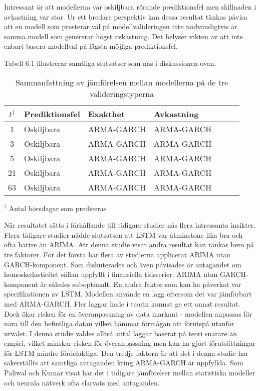 \documentclass[11pt]{article}
\numberwithin{equation}{section}
\numberwithin{table}{section}
\numberwithin{figure}{section}
\begin{document}
Intressant är att modellerna var oskiljbara rörande prediktionsfel men skillnaden i avkastning var stor. Ur ett bredare perspektiv kan dessa resultat tänkas påvisa att en modell som presterar väl på modellvalideringen inte nödvändigtvis är samma modell som genererar högst avkastning. Det belyser vikten av att inte enbart basera modellval på lägsta möjliga prediktionsfel. 

Tabell 6.1 illustrerar samtliga slutsatser som nås i diskussionen ovan.

\begin{table}[H]
\caption{Sammanfattning av jämförelsen mellan modellerna på de tre valideringstyperna}

\begin{tabularx}{\textwidth}{c *{6}{Y}}
\toprule
$t ^\dagger$  & Prediktionsfel & Exakthet & Avkastning \\
\hline

1      & Oskiljbara          & ARMA-GARCH                 & ARMA-GARCH          \\
3      & Oskiljbara          & ARMA-GARCH          & ARMA-GARCH    \\

5      & Oskiljbara          & ARMA-GARCH         &ARMA-GARCH   \\

21     &  Oskiljbara         & ARMA-GARCH         & ARMA-GARCH   \\


63     & Oskiljbara         & ARMA-GARCH         & ARMA-GARCH    \\ 

\bottomrule
\end{tabularx}
\footnotesize{$^\dagger$ Antal börsdagar som prediceras}
\end{table}

När resultatet sätts i förhållande till tidigare studier nås flera intressanta insikter. Flera tidigare studier nådde slutsatsen att LSTM var åtminstone lika bra och ofta bättre än ARIMA. Att denna studie visat andra resultat kan tänkas bero på tre faktorer. För det första har flera av studierna applicerat ARIMA utan GARCH-komponent. Som diskuterades och även påvisades är antagandet om homoskedasticitet sällan uppfyllt i finansiella tidsserier. ARIMA utan GARCH-komponent är således suboptimalt. En andra faktor som kan ha påverkat var specifikationen av LSTM. Modellen använde en lagg eftersom det var jämförbart med ARMA-GARCH. Fler laggar hade i teorin kunnat ge ett annat resultat. Dock ökar risken för en överanpassning av data markant -  modellen anpassas för nära till den befintliga datan vilket hämmar förmågan att förutspå utanför urvalet. I denna studie valdes alltså antal laggar baserat på teori snarare än empiri, vilket minskar risken för överanpassning men kan ha gjort förutsättningar för LSTM mindre fördelaktiga. Den tredje faktorn är att det i denna studie har säkerställts att samtliga antaganden kring ARMA-GARCH är uppfyllda. Som Paliwal och Kumar \parencite*{paliwal2009neural} visat har det i tidigare jämförelser mellan statistiska modeller och neurala nätverk ofta slarvats med antaganden. 
\end{document}
